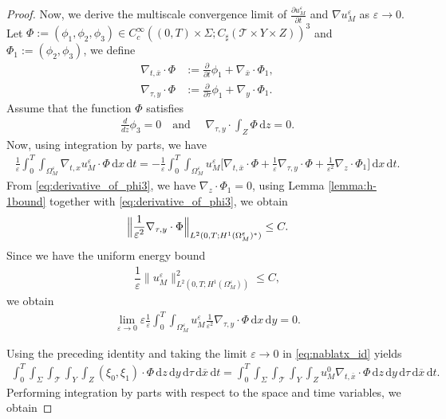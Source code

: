 \documentclass[11pt]{article}
\def\es{\varepsilon}
\def\omm{\Omega_M^\varepsilon}
\def\p{\partial}
\def\mint{\int_{0}^{T}\int_{\Sigma}\int_{\mathcal{T}}\int_{Y}\int_{Z}}
\def\Mint{\int_0^T\int_{\omm}}
\def\dzdy{\di{z}\di{y}\di{\tau}\di{\overline{x}}\di{t}}
\def\T{\mathcal{T}}
\newcommand{\di}[1]{\,\mathrm{d}#1}
\begin{document}
\begin{proof}
        
        Now, we derive the multiscale convergence limit of $\frac{\p u_M^\es}{\p t}$ and $\nabla u_M^\es$ as $\es\rightarrow 0$.
        Let $\Phi:=(\phi_1,\phi_2,\phi_3)\in C_c^\infty ((0,T)\times \Sigma;C_{\sharp}(\T\times Y\times Z))^3$ and  $\Phi_1:=(\phi_2,\phi_3)$, we define 
        \begin{align*}
            \nabla_{t,\bar x}\cdot\Phi&:=\frac{\p}{\p t}\phi_1+\nabla_{\bar x}\cdot \Phi_1,\\
            \nabla_{\tau,y}\cdot\Phi&:=\frac{\p}{\p \tau}\phi_1+\nabla_{y}\cdot \Phi_1.
        \end{align*}
        Assume that the function $\Phi$ satisfies 
        \begin{align}\label{eq:derivative_of_phi3}
            \frac{d}{dz}\phi_3=0 \quad\mbox{and }\quad \nabla_{\tau,y}\cdot\int_Z\Phi\di{z}=0.
        \end{align} 
        Now, using integration by parts, we have
        \begin{align}\label{eq:nablatx_id}
            \frac{1}{\es}\int_0^T\int_{\omm}\nabla_{t,x} u_M^\es\cdot \Phi\di{x}\di{t}=-\frac{1}{\es}\Mint u_M^\es\Big[\nabla_{t,\bar x}\cdot\Phi+\frac{1}{\es}\nabla_{\tau,y}\cdot\Phi+\frac{1}{\es^2}\nabla_z\cdot \Phi_1\Big]\di{x}\di{t}.        \end{align}
            From \eqref{eq:derivative_of_phi3}, we have $\nabla_z\cdot \Phi_1=0$, using Lemma \ref{lemma:h-1bound} together with \eqref{eq:derivative_of_phi3}, we obtain
            \begin{align*}
                \Bigl\|\frac{1}{\es^2}\nabla_{\tau,y}\cdot\Phi\Bigr\|_{L^2(0,T;H^{1}(\omm)^*)}\leq C.
            \end{align*}
           Since we have the uniform energy  bound
           \begin{align*}
               \dfrac{1}{\es}\| u_M^\es\|_{L^2(0,T;H^1(\omm))}^2\leq C,
           \end{align*}
           we obtain
            \begin{align*}
                \lim_{\es\rightarrow 0}\es\frac{1}{\es}\Mint u_M^\es \frac{1}{\es^2}\nabla_{\tau,y}\cdot \Phi \di{x}\di{y}=0.
            \end{align*}

        Using the preceding identity and  taking the limit $\es\rightarrow 0$ in \eqref{eq:nablatx_id} yields
            \begin{align*}
                \mint(\xi_0,\xi_1)\cdot\Phi\dzdy=\mint u_M^0 \nabla_{t,\bar x}\cdot \Phi\dzdy.
            \end{align*}
           Performing integration by parts with respect to the space and time variables, we obtain


\end{proof}
\end{document}
